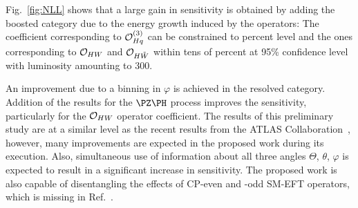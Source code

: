 \documentclass[a4paper,11pt]{article}
\begin{document}
Fig.~\ref{fig:NLL} shows that a large gain in sensitivity is obtained by adding the boosted category due to the energy growth induced by the operators:
The coefficient corresponding to ${\cal O}^{(3)}_{Hq}$ can be constrained to percent level and the ones corresponding to ${\cal O}_{HW}$ and ${\cal O}_{H\tilde{W}}$ within tens of percent at 95\% confidence level with luminosity amounting to 300\fbinv. 

An improvement due to a binning in $\varphi$ is achieved in the resolved category. 
Addition of the results for the $\PZ\PH$ process improves the sensitivity, particularly for the ${\cal O}_{HW}$ operator coefficient.
The results of this preliminary study are at a similar level as the recent results from the ATLAS Collaboration~\cite{ATLAS-CONF-2021-051},
however, many improvements are expected in the proposed work during its execution.
Also, simultaneous use of information about all three angles $\Theta$, $\theta$, $\varphi$ is expected to result in a significant increase in sensitivity.
The proposed work is also capable of disentangling the effects of CP-even and -odd SM-EFT operators, which is missing in Ref.~\cite{ATLAS-CONF-2021-051}. 
\end{document}
